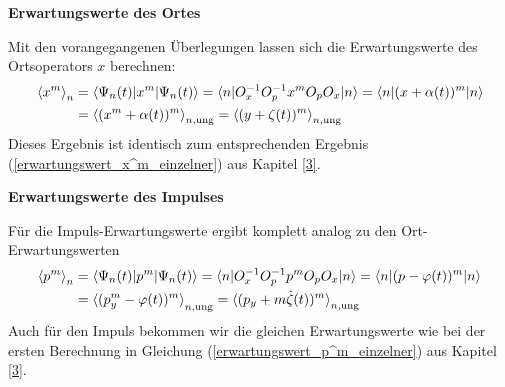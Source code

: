   \textbf{Erwartungswerte des Ortes}

  Mit den vorangegangenen Überlegungen lassen sich die Erwartungswerte des Ortsoperators $x$ berechnen:
  \begin{align}
    \braket{x^m}_n&=\braket{\Psi_n(t)|x^m|\Psi_n(t)}=\braket{n|O_x^{-1}O_p^{-1}x^mO_pO_x|n}=\braket{n|(x+\alpha(t))^m|n}\notag\\
    &=\braket{(x^m+\alpha(t))^m}_{n,\text{ung}}
    =\braket{(y+\zeta(t))^m}_{n,\text{ung}}
  \end{align}
  Dieses Ergebnis ist identisch zum entsprechenden Ergebnis (\ref{erwartungswert_x^m_einzelner}) aus Kapitel \ref{3}.

  \textbf{Erwartungswerte des Impulses}

  Für die Impuls-Erwartungswerte ergibt komplett analog zu den Ort-Erwartungswerten
  \begin{align}
    \braket{p^m}_n&=\braket{\Psi_n(t)|p^m|\Psi_n(t)}=\braket{n|O_x^{-1}O_p^{-1}p^mO_pO_x|n}=\braket{n|(p-\varphi(t))^m|n}\notag\\
    &=\braket{(p_y^m-\varphi(t))^m}_{n,\text{ung}}
    =\braket{(p_y+m\dot\zeta(t))^m}_{n,\text{ung}}
  \end{align}
  Auch für den Impuls bekommen wir die gleichen Erwartungswerte wie bei der ersten Berechnung in Gleichung (\ref{erwartungswert_p^m_einzelner}) aus Kapitel \ref{3}.


